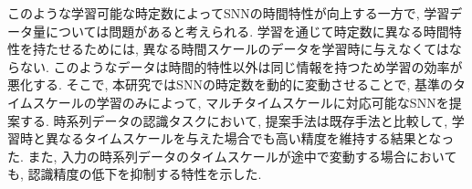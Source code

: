 このような学習可能な時定数によってSNNの時間特性が向上する一方で, 学習データ量については問題があると考えられる.
学習を通じて時定数に異なる時間特性を持たせるためには, 異なる時間スケールのデータを学習時に与えなくてはならない.
このようなデータは時間的特性以外は同じ情報を持つため学習の効率が悪化する.
そこで, 本研究ではSNNの時定数を動的に変動させることで, 基準のタイムスケールの学習のみによって, マルチタイムスケールに対応可能なSNNを提案する.
時系列データの認識タスクにおいて, 提案手法は既存手法と比較して, 学習時と異なるタイムスケールを与えた場合でも高い精度を維持する結果となった.
また, 入力の時系列データのタイムスケールが途中で変動する場合においても, 認識精度の低下を抑制する特性を示した.


